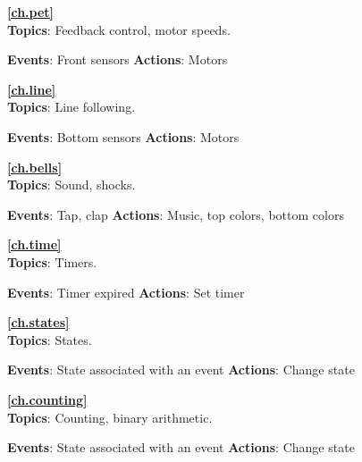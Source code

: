 \bigskip

{\centering \textbf{\cref{ch.pet}}\\}
\textbf{Topics}: Feedback control, motor speeds.

\textbf{Events}: Front sensors \hfill \textbf{Actions}: Motors

 \hfill {}

\bigskip

{\centering \textbf{\cref{ch.line}}\\}
\textbf{Topics}: Line following.

\textbf{Events}: Bottom sensors \hfill \textbf{Actions}: Motors

 \hfill {}

\bigskip

{\centering \textbf{\cref{ch.bells}}\\}
\textbf{Topics}: Sound, shocks.

\textbf{Events}: Tap, clap \hfill \textbf{Actions}: Music, top colors,
bottom colors

 \quad {} \hfill {}
\quad {} \quad {}

\newpage

{\centering \textbf{\cref{ch.time}}\\}
\textbf{Topics}: Timers.

\textbf{Events}: Timer expired \hfill \textbf{Actions}: Set timer

 \hfill {}

\bigskip

{\centering \textbf{\cref{ch.states}}\\}
\textbf{Topics}: States.

\textbf{Events}: State associated with an event \hfill \textbf{Actions}:
Change state

 \hfill {}

\bigskip

{\centering \textbf{\cref{ch.counting}}\\}
\textbf{Topics}: Counting, binary arithmetic.

\textbf{Events}: State associated with an event \hfill \textbf{Actions}:
Change state

 \hfill {}

\bigskip

